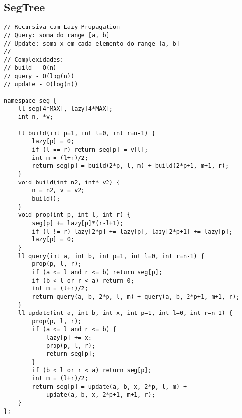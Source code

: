 \documentclass[12pt, a4paper, twoside]{article}
\begin{document}
\subsection{SegTree}
\begin{lstlisting}
// Recursiva com Lazy Propagation
// Query: soma do range [a, b]
// Update: soma x em cada elemento do range [a, b]
//
// Complexidades:
// build - O(n)
// query - O(log(n))
// update - O(log(n))

namespace seg {
	ll seg[4*MAX], lazy[4*MAX];
	int n, *v;

	ll build(int p=1, int l=0, int r=n-1) {
		lazy[p] = 0;
		if (l == r) return seg[p] = v[l];
		int m = (l+r)/2;
		return seg[p] = build(2*p, l, m) + build(2*p+1, m+1, r);
	}
	void build(int n2, int* v2) {
		n = n2, v = v2;
		build();
	}
	void prop(int p, int l, int r) {
		seg[p] += lazy[p]*(r-l+1);
		if (l != r) lazy[2*p] += lazy[p], lazy[2*p+1] += lazy[p];
		lazy[p] = 0;
	}
	ll query(int a, int b, int p=1, int l=0, int r=n-1) {
		prop(p, l, r);
		if (a <= l and r <= b) return seg[p];
		if (b < l or r < a) return 0;
		int m = (l+r)/2;
		return query(a, b, 2*p, l, m) + query(a, b, 2*p+1, m+1, r);
	}
	ll update(int a, int b, int x, int p=1, int l=0, int r=n-1) {
		prop(p, l, r);
		if (a <= l and r <= b) {
			lazy[p] += x;
			prop(p, l, r);
			return seg[p];
		}
		if (b < l or r < a) return seg[p];
		int m = (l+r)/2;
		return seg[p] = update(a, b, x, 2*p, l, m) +
			update(a, b, x, 2*p+1, m+1, r);
	}
};
\end{lstlisting}
\end{document}
